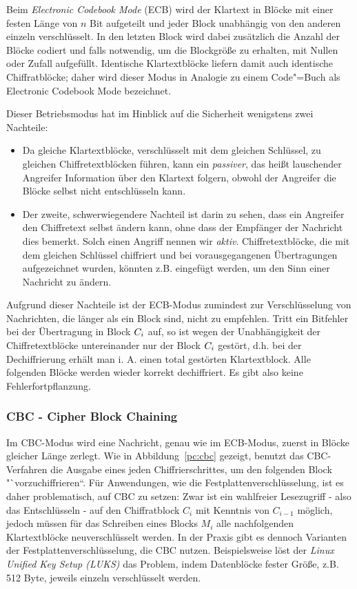 Beim \emph{Electronic Codebook Mode} (ECB) wird der Klartext in Blöcke mit einer festen Länge von $n$ Bit aufgeteilt und jeder Block unabhängig von den anderen einzeln verschlüsselt. In den
letzten Block wird dabei zusätzlich die Anzahl der Blöcke codiert und falls notwendig, um die Blockgröße zu erhalten, mit Nullen oder Zufall aufgefüllt.
Identische Klartextblöcke liefern damit auch identische Chiffratblöcke; daher wird dieser Modus in Analogie zu einem Code"=Buch als Electronic Codebook Mode bezeichnet.

Dieser Betriebsmodus hat im Hinblick auf die Sicherheit wenigstens zwei Nachteile:
\begin{itemize}
	\item Da gleiche Klartextblöcke, verschlüsselt mit dem gleichen Schlüssel, zu gleichen Chiffretextblöcken führen, kann ein \emph{passiver}, das heißt lauschender Angreifer
	Information über den Klartext folgern, obwohl der Angreifer die Blöcke selbst nicht entschlüsseln kann.
	\item Der zweite, schwerwiegendere Nachteil ist darin zu sehen, dass ein Angreifer den Chiffretext selbst ändern kann, ohne dass der Empfänger der
	Nachricht dies bemerkt. Solch einen Angriff nennen wir \emph{aktiv}. Chiffretextblöcke, die mit dem gleichen Schlüssel chiffriert und bei vorausgegangenen Übertragungen aufgezeichnet wurden, könnten
	z.B. eingefügt werden, um den Sinn einer Nachricht zu ändern.
\end{itemize}

Aufgrund dieser Nachteile ist der ECB-Modus zumindest zur Verschlüsselung von Nachrichten, die länger als ein Block sind, nicht zu empfehlen.
Tritt ein Bitfehler bei der Übertragung in Block $C_i$ auf, so ist wegen der Unabhängigkeit der Chiffretextblöcke untereinander nur der Block
$C_i$ gestört, d.h. bei der Dechiffrierung erhält man i. A. einen total gestörten Klartextblock. Alle folgenden Blöcke werden wieder korrekt
dechiffriert. Es gibt also keine Fehlerfortpflanzung.

\subsubsection{CBC - Cipher Block Chaining}\label{ssec:cbc}
Im CBC-Modus wird eine Nachricht, genau wie im ECB-Modus, zuerst in Blöcke gleicher Länge zerlegt. Wie in Abbildung~\ref{pc:cbc} gezeigt, benutzt das CBC-Verfahren die Ausgabe eines jeden Chiffrierschrittes, um den folgenden Block "`vorzuchiffrieren``.
Für Anwendungen, wie die Festplattenverschlüsselung, ist es daher problematisch, auf CBC zu setzen: Zwar ist ein wahlfreier Lesezugriff - also das Entschlüsseln - auf den Chiffratblock $C_i$ mit Kenntnis von $C_{i-1}$ möglich, jedoch müssen für das Schreiben eines Blocks $M_i$ alle nachfolgenden Klartextblöcke neuverschlüsselt werden. In der Praxis gibt es dennoch Varianten der Festplattenverschlüsselung, die CBC nutzen.
Beispielsweise löst der \textit{Linux Unified Key Setup (LUKS)} das Problem, indem Datenblöcke fester Größe, z.B. 512 Byte, jeweils einzeln verschlüsselt werden.

